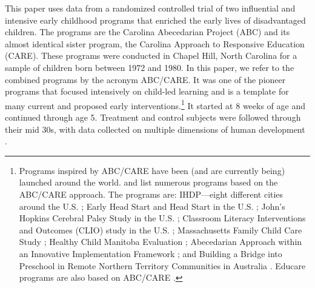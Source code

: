 This paper uses data from a randomized controlled trial of two influential and intensive early childhood programs that enriched the early lives of disadvantaged children. The programs are the Carolina Abecedarian Project (ABC) and its almost identical sister program, the Carolina Approach to Responsive Education (CARE). These programs were conducted in Chapel Hill, North Carolina for a sample of children born between 1972 and 1980. In this paper, we refer to the combined programs by the acronym ABC/CARE. It was one of the pioneer programs that focused intensively on child-led learning and is a template for many current and proposed early interventions.\footnote{Programs inspired by ABC/CARE have been (and are currently being) launched around the world. \citet{Sparling_2010_Highlights} and \citet{Ramey_Ramey_Lanzi_2014_Interventions} list numerous programs based on the ABC/CARE approach. The programs are: IHDP---eight different cities around the U.S. \citep{Spiker-etal_1997_Helping}; Early Head Start and Head Start in the U.S. \citep{Schneider_McDonald-eds_2007_Scale-Up_Vol-1}; John's Hopkins Cerebral Palsy Study in the U.S. \citep{Sparling_2010_Highlights}; Classroom Literacy Interventions and Outcomes (CLIO) study in the U.S. \citep{Sparling_2010_Highlights}; Massachusetts Family Child Care Study \citep{Collins_etal_2010_Massachusetts-Study}; Healthy Child Manitoba Evaluation \citep{Healthy_Child_Manitoba_2015_Starting-Early}; Abecedarian Approach within an Innovative Implementation Framework \citep{Jensen_Nielsen_2016_ABC-Programme-Pilot}; and Building a Bridge into Preschool in Remote Northern Territory Communities in Australia \citep{UMonash_Dataset_2015_URL}. Educare programs are also based on ABC/CARE \citep{Educare_2014_Research_Agenda,Yazejian_Bryant_2012_Educare}.} It started at 8 weeks of age and continued through age 5. Treatment and control subjects were followed through their mid 30s, with data collected on multiple dimensions of human development \citep{Ramey_Campbell_1991_childreninpoverty}.

